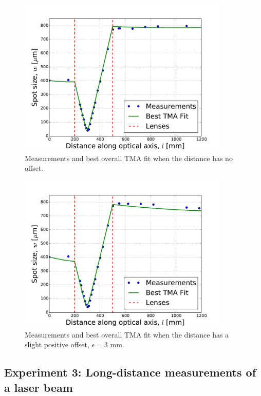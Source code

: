 \documentclass[a4paper, 11pt, notitlepage, english]{article}
\begin{document}
\begin{figure}[ht]
\centering
\includegraphics[width=0.9\textwidth]{beam_expander_dataset_1.pdf}	
\caption{Measurements and best overall TMA fit when the distance has no offset. \label{fig:e2r2}}
\end{figure}

\begin{figure}[ht]
\centering
\includegraphics[width=0.9\textwidth]{beam_expander_dataset_2.pdf}	
\caption{Measurements and best overall TMA fit when the distance has a slight positive offset, $\epsilon=3$ mm. \label{fig:e2r3}}
\end{figure}

\clearpage

\subsection{Experiment 3: Long-distance measurements of a laser beam}
\end{document}
